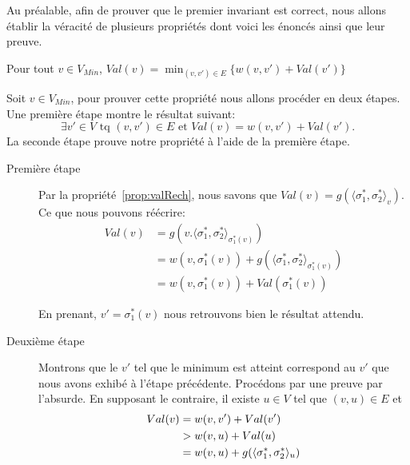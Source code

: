 Au préalable, afin de prouver que le premier invariant est correct, nous allons établir la véracité de plusieurs propriétés dont voici les énoncés ainsi que leur preuve.

\setcounter{equation}{0}

\begin{propriete}
	\label{prop:dijk00}
	Pour tout $v \in V_{Min}$, $Val(v) = \min_{(v,v') \in E}\{ w(v,v') + Val(v') \}$
\end{propriete}

\begin{demonstration}
	Soit $v \in V_{Min}$, pour prouver cette propriété nous allons procéder en deux étapes. Une première étape montre le résultat suivant:
	$$ \exists v' \in V \text{ tq } (v,v') \in E \text{ et } Val(v) = w(v,v') + Val(v').$$ La seconde étape prouve notre propriété à l'aide de la première étape.
	
	\begin{description}
		\item[Première étape]$ $\\
		
		Par la propriété~\ref{prop:valRech}, nous savons que $ Val(v) = g(\langle \sigma_1^*, \sigma_2^* \rangle_v).$
		Ce que nous pouvons réécrire:
		\begin{align*} 
			Val(v) &= g( v. \langle \sigma_1^*, \sigma_2^* \rangle_{\sigma_1^*(v)})\\
			   &= w(v, \sigma_1^*(v)) + g(\langle \sigma_1^*, \sigma_2^* \rangle_{\sigma_1^*(v)})\\
			   &= w(v, \sigma_1^*(v)) + Val(\sigma_1^*(v))
		\end{align*}
		
		En prenant, $v' = \sigma_1^*(v)$ nous retrouvons bien le résultat attendu.
		
		\item[Deuxième étape] $ $\\
		Montrons que le $v'$ tel que le minimum est atteint correspond au $v'$ que nous avons exhibé à l'étape précédente. Procédons par une preuve par l'absurde.
		En supposant le contraire, il existe $u \in V$ tel que $(v,u) \in E$ et 
		\begin{align}  Val(v) &= w(v,v') + Val(v')\notag \\
			 									&> w(v,u) + Val(u) \notag\\
												&= w(v,u) + g(\langle \sigma_1^*, \sigma_2^* \rangle_u)\label{eq:minMax42}
		\end{align}
		

\end{description}
\end{demonstration}

